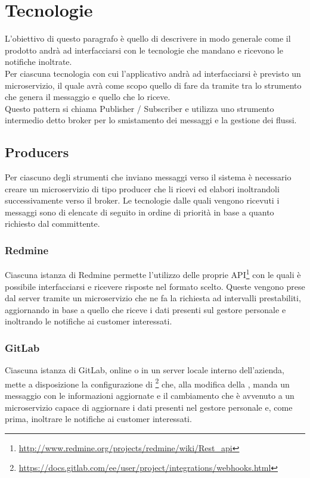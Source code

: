 \newpage
\section{Tecnologie}
	L'obiettivo di questo paragrafo è quello di descrivere in modo generale come il prodotto andrà ad interfacciarsi con le tecnologie che mandano e ricevono le notifiche inoltrate.\\
	Per ciascuna tecnologia con cui l'applicativo andrà ad interfacciarsi è previsto un microservizio, il quale avrà come scopo quello di fare da tramite tra lo strumento che genera il messaggio e quello che lo riceve.\\
	Questo pattern si chiama Publisher / Subscriber e utilizza uno strumento intermedio detto broker per lo smistamento dei messaggi e la gestione dei flussi.
	
	\subsection{Producers}
	
		Per ciascuno degli strumenti che inviano messaggi verso il sistema è necessario creare un microservizio di tipo producer che li ricevi ed elabori inoltrandoli successivamente verso il broker.
		Le tecnologie dalle quali vengono ricevuti i messaggi sono di elencate di seguito in ordine di priorità in base a quanto richiesto dal committente.

		\subsubsection{Redmine}
		Ciascuna istanza di Redmine permette l'utilizzo delle proprie API\footnote{\url{http://www.redmine.org/projects/redmine/wiki/Rest_api}} con le quali è possibile interfacciarsi e ricevere risposte nel formato scelto.
		Queste vengono prese dal server tramite un microservizio che ne fa la richiesta ad intervalli prestabiliti, aggiornando in base a quello che riceve i dati presenti sul gestore personale e inoltrando le notifiche ai customer interessati.
		
		\subsubsection{GitLab}
		Ciascuna istanza di GitLab, online o in un server locale interno dell'azienda, mette a disposizione la configurazione di \footnote{\url{https://docs.gitlab.com/ee/user/project/integrations/webhooks.html}} che, alla modifica della , manda un messaggio con le informazioni aggiornate e il cambiamento che è avvenuto a un microservizio capace di aggiornare i dati presenti nel gestore personale e, come prima, inoltrare le notifiche ai customer interessati.
		
